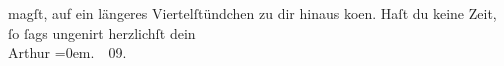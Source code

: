 \begin{ledgroupsized}[t]{13cm}
               magſt, auf ein längeres Viertelſtündchen zu dir hinaus ko{\geminationm}en. {\pb}Haſt du keine
               Zeit, ſo ſags ungenirt\pend
           \pstart
           herzlichſt dein{\\[\baselineskip]}\spacefill\mbox{Arthur}\pend
           \leftskip=0em{}. \label{T_L01823_1v}\label{T_L01823_1h} 09. \pend
           \endnumbering{}\end{ledgroupsized}  \newcommand{\dateiname}{L01823}\newcommand{\titel}{Arthur Schnitzler an Hermann Bahr, 16. [1.] 1909}\newcommand{\editorInnen}{ Kurt Ifkovits,  Martin Anton Müller}
      